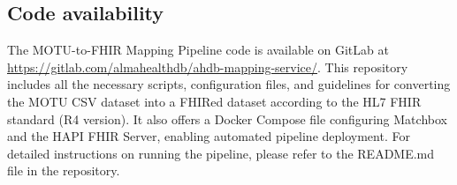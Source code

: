 \subsection*{Code availability}
The MOTU-to-FHIR Mapping Pipeline code is available on GitLab at \url{https://gitlab.com/almahealthdb/ahdb-mapping-service/}. This repository includes all the necessary scripts, configuration files, and guidelines for converting the MOTU CSV dataset into a FHIRed dataset according to the HL7 FHIR standard (R4 version). It also offers a Docker Compose file configuring Matchbox and the HAPI FHIR Server, enabling automated pipeline deployment. For detailed instructions on running the pipeline, please refer to the README.md file in the repository.

\FloatBarrier
